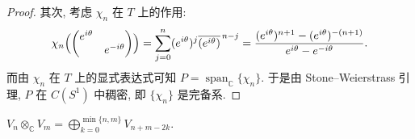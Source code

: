 \begin{proof}
其次, 考虑 $\chi_n$ 在 $T$ 上的作用:
\[
  \chi_n\Bigl(\begin{pmatrix}e^{i\theta}&\\&e^{-i\theta}\end{pmatrix}\Bigr)
  =\sum_{j=0}^{n}(e^{i\theta})^j\overline{(e^{i\theta})}^{\,n-j}
  =\frac{(e^{i\theta})^{n+1}-(e^{i\theta})^{-(n+1)}}{e^{i\theta}-e^{-i\theta}} .
\]
而由 $\chi_n$ 在 $T$ 上的显式表达式可知 $P=\operatorname{span}_{\mathbb{C}}\{\chi_n\}$.
于是由 Stone--Weierstrass 引理, $P$ 在 $C(S^1)$ 中稠密, 即 $\{\chi_n\}$ 是完备系.
\end{proof}

\begin{remark}\label{rem:sl2-tensor-decomposition}
$V_n\otimes_{\mathbb{C}}V_m=\bigoplus_{k=0}^{\min\{n,m\}}V_{n+m-2k}$.
\end{remark}

